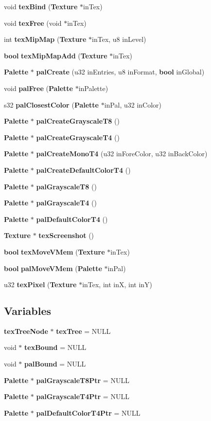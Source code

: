 \begin{CompactItemize}
\item 
void {\bf tex\-Bind} ({\bf Texture} $\ast$in\-Tex)
\item 
void {\bf tex\-Free} (void $\ast$in\-Tex)
\item 
int {\bf tex\-Mip\-Map} ({\bf Texture} $\ast$in\-Tex, u8 in\-Level)
\item 
{\bf bool} {\bf tex\-Mip\-Map\-Add} ({\bf Texture} $\ast$in\-Tex)
\item 
{\bf Palette} $\ast$ {\bf pal\-Create} (u32 in\-Entries, u8 in\-Format, {\bf bool} in\-Global)
\item 
void {\bf pal\-Free} ({\bf Palette} $\ast$in\-Palette)
\item 
s32 {\bf pal\-Closest\-Color} ({\bf Palette} $\ast$in\-Pal, u32 in\-Color)
\item 
{\bf Palette} $\ast$ {\bf pal\-Create\-Grayscale\-T8} ()
\item 
{\bf Palette} $\ast$ {\bf pal\-Create\-Grayscale\-T4} ()
\item 
{\bf Palette} $\ast$ {\bf pal\-Create\-Mono\-T4} (u32 in\-Fore\-Color, u32 in\-Back\-Color)
\item 
{\bf Palette} $\ast$ {\bf pal\-Create\-Default\-Color\-T4} ()
\item 
{\bf Palette} $\ast$ {\bf pal\-Grayscale\-T8} ()
\item 
{\bf Palette} $\ast$ {\bf pal\-Grayscale\-T4} ()
\item 
{\bf Palette} $\ast$ {\bf pal\-Default\-Color\-T4} ()
\item 
{\bf Texture} $\ast$ {\bf tex\-Screenshot} ()
\item 
{\bf bool} {\bf tex\-Move\-VMem} ({\bf Texture} $\ast$in\-Tex)
\item 
{\bf bool} {\bf pal\-Move\-VMem} ({\bf Palette} $\ast$in\-Pal)
\item 
u32 {\bf tex\-Pixel} ({\bf Texture} $\ast$in\-Tex, int in\-X, int in\-Y)
\end{CompactItemize}
\subsection*{Variables}
\begin{CompactItemize}
\item 
{\bf tex\-Tree\-Node} $\ast$ {\bf tex\-Tree} = NULL
\item 
void $\ast$ {\bf tex\-Bound} = NULL
\item 
void $\ast$ {\bf pal\-Bound} = NULL
\item 
{\bf Palette} $\ast$ {\bf pal\-Grayscale\-T8Ptr} = NULL
\item 
{\bf Palette} $\ast$ {\bf pal\-Grayscale\-T4Ptr} = NULL
\item 
{\bf Palette} $\ast$ {\bf pal\-Default\-Color\-T4Ptr} = NULL
\end{CompactItemize}


